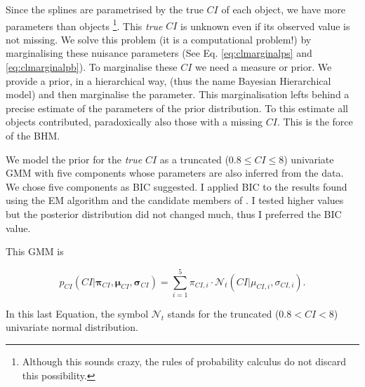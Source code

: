 Since the splines are parametrised by the true $CI$ of each object, we have more parameters than objects \footnote{Although this sounds crazy, the rules of probability calculus do not discard this possibility.}. This \emph{true} $CI$ is unknown even if its observed value is not missing. We solve this problem (it is a computational problem!) by marginalising these nuisance parameters (See Eq. \ref{eq:clmarginalps} and \ref{eq:clmarginalpb}). To marginalise these $CI$ we need a measure or prior. We provide a prior, in a hierarchical way, (thus the name Bayesian Hierarchical model) and then marginalise the parameter. This marginalisation lefts behind a precise estimate of the parameters of the prior distribution. To this estimate all objects contributed, paradoxically also those with a missing $CI$. This is the force of the BHM.

We model the prior for the \emph{true} $CI$  as a truncated ($0.8\leq CI \leq8$) univariate GMM with five components whose parameters are also inferred from the data. We chose five components as BIC suggested. I applied BIC to the results found using the EM algorithm and the candidate members of \citet{Bouy2015}. I tested higher values but the posterior distribution did not changed much, thus I preferred the BIC value.

 This GMM is 

\begin{equation}
\label{eq:colordist}
p_{CI}(CI|\boldsymbol{\pi}_{CI},\boldsymbol{\mu}_{CI},\boldsymbol{\sigma}_{CI})= \sum_{i=1}^5 \pi_{CI,i} \cdot \mathcal{N}_t(CI| \mu_{CI,i},\sigma_{CI,i}).
\end{equation}

In this last Equation, the symbol $\mathcal{N}_t$ stands for the truncated ($0.8<CI<8$) univariate normal distribution.

